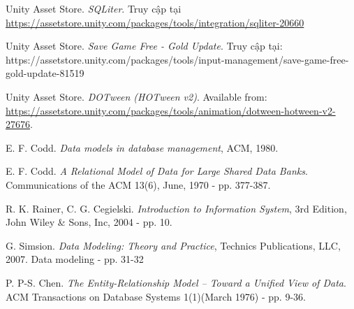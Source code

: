 \begin{thebibliography}{1}
	 Unity Asset Store. \textit{SQLiter}. Truy cập tại \url{https://assetstore.unity.com/packages/tools/integration/sqliter-20660}

	
	Unity Asset Store. \textit{Save Game Free - Gold Update}. Truy cập tại: https://assetstore.unity.com/packages/tools/input-management/save-game-free-gold-update-81519
	
	Unity Asset Store. \textit{DOTween (HOTween v2)}. Available from: \url{https://assetstore.unity.com/packages/tools/animation/dotween-hotween-v2-27676}.
	
	 E. F. Codd. \textit{Data models in database management}, ACM, 1980. 
	
	 E. F. Codd. \textit{A Relational Model of Data for Large Shared Data Banks}. Communications of the ACM 13(6), June, 1970 - pp. 377-387.
	
	 R. K. Rainer, C. G. Cegielski. \textit{Introduction to Information System}, 3rd Edition, John Wiley \& Sons, Inc, 2004 - pp. 10.
	
	G. Simsion. \textit{Data Modeling: Theory and Practice}, Technics Publications, LLC, 2007. 
	Data modeling - pp. 31-32
	
	 P. P-S. Chen. \textit{The Entity-Relationship Model – Toward a Unified View of 
		Data}. ACM Transactions on Database Systems 1(1)(March 1976) - pp. 9-36. 
	
\end{thebibliography}